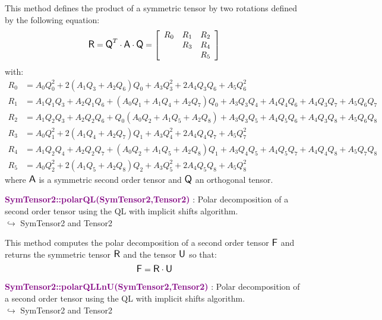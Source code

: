 This method defines the product of a symmetric tensor by two rotations defined by the following equation:
\begin{equation*}
\mbox{\large\ensuremath{\mathsf{R}}} = \mbox{\large\ensuremath{\mathsf{Q}}}^T \cdot \mbox{\large\ensuremath{\mathsf{A}}} \cdot \mbox{\large\ensuremath{\mathsf{Q}}} =\left[\begin{array}{ccc}
R_0&R_1&R_2\\
&R_3&R_4\\
&&R_5
\end{array}\right]
\end{equation*}
with:
\begin{align*}
R_0 &= A_0 Q_0^2 + 2 (A_1 Q_3 + A_2 Q_6) Q_0 + A_3 Q_3^2 + 2 A_4 Q_3 Q_6 + A_5 Q_6^2 \\
R_1 &= A_1 Q_1 Q_3 +A_2 Q_1 Q_6 + (A_0 Q_1 + A_1 Q_4 + A_2 Q_7) Q_0+ A_3 Q_3 Q_4 + A_4 Q_4 Q_6 + A_4 Q_3 Q_7 + A_5 Q_6 Q_7\\
R_2 &= A_1 Q_2 Q_3 + A_2 Q_2 Q_6 + Q_0 (A_0 Q_2 + A_1 Q_5 + A_2 Q_8) + A_3 Q_3 Q_5 + A_4 Q_5 Q_6 + A_4 Q_3 Q_8 + A_5 Q_6 Q_8\\
R_3 &= A_0 Q_1^2 + 2 (A_1 Q_4 + A_2 Q_7)Q_1 + A_3 Q_4^2 + 2 A_4 Q_4 Q_7 + A_5 Q_7^2\\
R_4 &= A_1 Q_2 Q_4 + A_2 Q_2 Q_7 + (A_0 Q_2 + A_1 Q_5 + A_2 Q_8)Q_1 + A_3 Q_4 Q_5 + A_4 Q_5 Q_7 + A_4 Q_4 Q_8 + A_5 Q_7 Q_8\\
R_5 &= A_0 Q_2^2 + 2 (A_1 Q_5 + A_2 Q_8) Q_2 + A_3 Q_5^2 + 2 A_4 Q_5 Q_8 + A_5 Q_8^2
\end{align*}
where $\mbox{\large\ensuremath{\mathsf{A}}}$ is a symmetric second order tensor and $\mbox{\large\ensuremath{\mathsf{Q}}}$ an orthogonal tensor.

\textcolor{purple}{\textbf{SymTensor2::polarQL(SymTensor2,Tensor2)}}\label{SymTensor2::polarQL(SymTensor2,Tensor2)} : Polar decomposition of a second order tensor using the QL with implicit shifts algorithm.\\ \hspace*{5mm}$\hookrightarrow$ SymTensor2 and Tensor2

This method computes the polar decomposition of a second order tensor $\mbox{\large\ensuremath{\mathsf{F}}}$ and returns the symmetric tensor $\mbox{\large\ensuremath{\mathsf{R}}}$ and the tensor $\mbox{\large\ensuremath{\mathsf{U}}}$ so that:
\begin{equation*}
\mbox{\large\ensuremath{\mathsf{F}}} = \mbox{\large\ensuremath{\mathsf{R}}} \cdot \mbox{\large\ensuremath{\mathsf{U}}}
\end{equation*}

\textcolor{purple}{\textbf{SymTensor2::polarQLLnU(SymTensor2,Tensor2)}}\label{SymTensor2::polarQLLnU(SymTensor2,Tensor2)} : Polar decomposition of a second order tensor using the QL with implicit shifts algorithm.\\ \hspace*{5mm}$\hookrightarrow$ SymTensor2 and Tensor2

